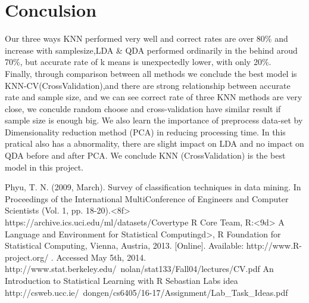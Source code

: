 \documentclass{article}\usepackage[]{graphicx}\usepackage[]{color}
\begin{document}
	\section{Conculsion}
	\noindent	Our three ways KNN performed very well and correct rates are over 80\% and increase with samplesize,LDA \& QDA performed ordinarily in the behind aroud 70\%, but accurate rate of k means is unexpectedly lower, with only 20\%.\\ 
	\noindent	Finally, through comparison between all methods we conclude the best model is KNN-CV(CrossValidation),and there are strong relationship between accurate rate and sample size, and we can see correct rate of three KNN methods are very close, we conculde random choose and cross-validation have similar result if sample size is enough big. We also learn the importance of preprocess data-set by Dimensionality reduction method (PCA) in reducing processing time.
	 In this pratical also has a abnormality, there are slight impact on LDA and no impact on QDA before and after PCA. We conclude KNN (CrossValidation) is the best model in this project.

\begin{thebibliography}{99}
Phyu, T. N. (2009, March). Survey of classification techniques in data mining. In Proceedings of the International MultiConference of Engineers and Computer Scientists (Vol. 1, pp. 18-20).<8f>
	https://archive.ics.uci.edu/ml/datasets/Covertype
	R Core Team, R:<9d> A Language and Environment for Statistical Computingd>, R Foundation for Statistical Computing, Vienna, Austria, 2013. [Online]. Available: http://www.R-project.org/ . Accessed May 5th, 2014.
http://www.stat.berkeley.edu/~nolan/stat133/Fall04/lectures/CV.pdf
 An Introduction to Statistical Learning with R
Sebastian Labs idea http://csweb.ucc.ie/~dongen/cs6405/16-17/Assignment/Lab_Task_Ideas.pdf

\end{thebibliography}	
	
\end{document}

